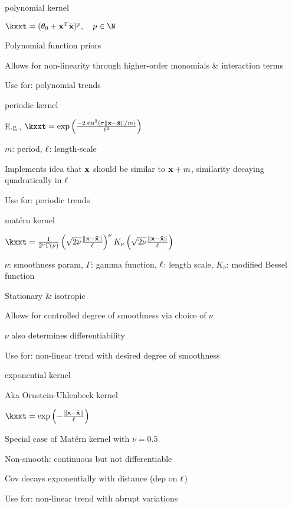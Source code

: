 \documentclass[11pt,compress,t,notes=noshow, xcolor=table]{beamer}
\begin{document}
\begin{framei}{polynomial kernel}
\item $\kxxt = (\theta_0 + \xv^T \xtil )^p, \quad p \in \N$
\item Polynomial function priors
\item Allows for non-linearity through higher-order monomials \& interaction terms
\item Use for: polynomial trends
\vfill
{}
\end{framei}

\begin{framei}{periodic kernel}
\item E.g., $\kxxt = \exp \left(\frac{-2\sin^2 (\pi \xxtnorm / m)}{\ls^2} \right)$
\item $m$: period, $\ell$: length-scale
\item Implements idea that $\mathbf{x}$ should be similar to $\mathbf{x} + m$, similarity decaying quadratically in $\ell$
\item Use for: periodic trends
\vfill
{}
\end{framei}

\begin{framei}{matérn kernel}
\item $\kxxt = \frac{1}{2^\nu \Gamma(\nu)} \left( \sqrt{2 \nu} \frac{\xxtnorm}{\ls} \right)^\nu K_\nu \left( \sqrt{2 \nu} \frac{\xxtnorm}{\ls} \right)$
\item $\nu$: smoothness param, $\Gamma$: gamma function, $\ell$: length scale, $K_\nu$: modified Bessel function
\item Stationary \& isotropic
\item Allows for controlled degree of smoothness via choice of $\nu$
\item $\nu$ also determines differentiability
\item Use for: non-linear trend with desired degree of smoothness
\vfill
{}
\end{framei}

\begin{framei}{exponential kernel}
\item Aka Ornstein-Uhlenbeck kernel
\item $\kxxt = \exp \left(-\frac{\xxtnorm}{\ls} \right)$
\item Special case of Matérn kernel with $\nu = 0.5$
\item Non-smooth: continuous but not differentiable
\item Cov decays exponentially with distance (dep on $\ell$)
\item Use for: non-linear trend with abrupt variations
\end{framei}
\end{document}
